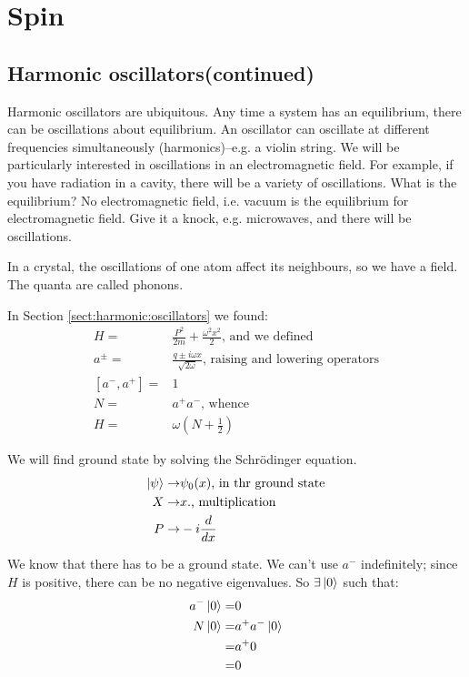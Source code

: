 \documentclass[]{article}
\begin{document}
\section{Spin}

\subsection{Harmonic oscillators(continued)}

Harmonic oscillators are ubiquitous. Any time a system has an equilibrium, there can be oscillations about equilibrium. An oscillator can oscillate at different frequencies simultaneously (harmonics)--e.g. a violin string. We will be particularly interested in oscillations in an electromagnetic field.  For example, if you have radiation in a cavity, there will be a variety of oscillations. What is the equilibrium? No electromagnetic field, i.e. vacuum is the equilibrium for electromagnetic field. Give it a knock, e.g. microwaves, and there will be oscillations.

In a crystal, the oscillations of one atom affect its neighbours, so we have a field. The quanta are called phonons.

In Section \ref{sect:harmonic:oscillators} we found:
\begin{align*}
	H =& \frac{P^2}{2m} + \frac{\omega^2 x^2}{2} \text{, and we defined}\\
	a^\pm=& \frac{q \pm i \omega x}{\sqrt{2 \omega}} \text{, raising and lowering operators}\\
	[a^-,a^+]=& 1\\
	N =& a^+a^- \text{, whence}\\
	H =& \omega(N+\frac{1}{2})
\end{align*}

We will find ground state by solving the Schr\"odinger equation.
\begin{align*}
	\ket{\psi} \rightarrow& \psi_0(x) \text{, in thr ground state}\\
	X \rightarrow& x. \text{, multiplication}\\
	P \rightarrow& -i \frac{d}{dx}
\end{align*}


We know that there has to be a ground state. We can't use $a^-$ indefinitely; since $H$ is positive, there can be no negative eigenvalues. So $\exists \ket{0}$ such that: 
\begin{align*}
	a^-\ket{0}=&0\\
	N\ket{0}=&a^+a^- \ket{0 }\\
	=& a^+0\\
	=&0
\end{align*}
\end{document}
